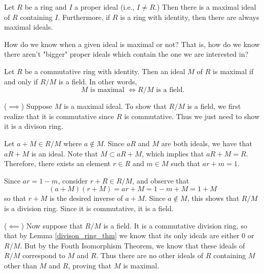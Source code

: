 \documentclass[12pt,letterpaper]{algebra_book}
\theoremstyle{definition}
\begin{document}
    \begin{thm}
        Let $R$ be a ring and $I$ a proper ideal (i.e., $I \ne
        R$.) Then there is a maximal ideal of $R$ containing $I$.
        Furthermore, if $R$ is a ring with identity, then there
        are always maximal ideals.
    \end{thm}

    How do we know when a given ideal is maximal or not? That is,
    how do we know there aren't "bigger" proper ideals which
    contain the one we are interested in?
    \begin{thm} \label{maximal_theorem}
        Let $R$ be a commutative ring with identity. Then an ideal
        $M$ of $R$ is maximal if and only if $R/M$ is a field. In
        other words, 
        \[
            M \text{ is maximal } \iff R/M \text{ is a field.}
        \]
        \vspace{-0.8cm}

    \end{thm}

    \begin{prf}
        ($\implies$) Suppose $M$ is a maximal ideal. To show that $R/M$ is a
        field, we first realize that it is commutative since $R$
        is commutative. Thus we just need to show it is a divison
        ring. 

        Let $a + M \in R/M$ where $a \not\in M$. Since $aR$ and
        $M$ are both ideals, we have that $aR + M$ is an ideal.
        Note that $M \subset aR + M$, which implies that $aR +  M
        = R$. Therefore, there exists an element $r \in R$ and $m
        \in M$ such
        that $ar + m = 1$. 

        Since $ar = 1 - m$, consider $r + R \in R/M$, and observe
        that 
        \[
            (a + M)(r + M) = ar + M = 1 - m + M = 1 + M
        \]
        so that $r + M$ is the desired inverse of $a + M$. Since
        $a \not\in M$, this shows that $R/M$ is a division ring.
        Since it is commutative, it is a field. 

        ($\impliedby$)
        Now suppose that $R/M$ is a field. It is a commutative
        division ring, so that by Lemma \ref{divison_ring_thm} we
        know that its only ideals are either $0$ or $R/M$. But by
        the Fouth Isomorphism Theorem, we know that these ideals of
        $R/M$ correspond to $M$ and $R$. Thus there are no other
        ideals of $R$ containing $M$ other than $M$ and $R$,
        proving that $M$ is maximal. 
    \end{prf}
\end{document}
